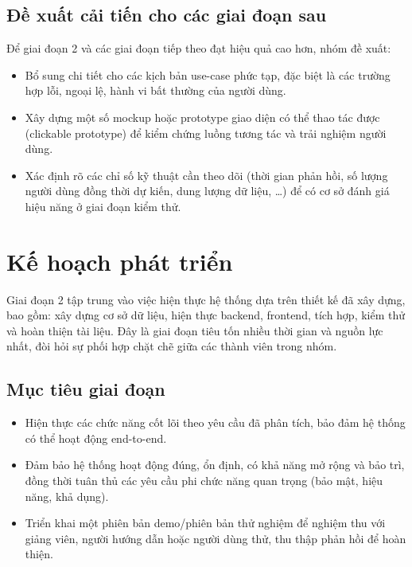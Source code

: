 \subsection{Đề xuất cải tiến cho các giai đoạn sau}

Để giai đoạn 2 và các giai đoạn tiếp theo đạt hiệu quả cao hơn, nhóm đề xuất:

\begin{itemize}
    \item Bổ sung chi tiết cho các kịch bản use-case phức tạp, đặc biệt là các trường hợp lỗi, ngoại lệ, hành vi bất thường của người dùng.
    \item Xây dựng một số mockup hoặc prototype giao diện có thể thao tác được (clickable prototype) để kiểm chứng luồng tương tác và trải nghiệm người dùng.
    \item Xác định rõ các chỉ số kỹ thuật cần theo dõi (thời gian phản hồi, số lượng người dùng đồng thời dự kiến, dung lượng dữ liệu, \ldots) để có cơ sở đánh giá hiệu năng ở giai đoạn kiểm thử.
\end{itemize}

\section{Kế hoạch phát triển}

Giai đoạn 2 tập trung vào việc hiện thực hệ thống dựa trên thiết kế đã xây dựng, bao gồm: xây dựng cơ sở dữ liệu, hiện thực backend, frontend, tích hợp, kiểm thử và hoàn thiện tài liệu. Đây là giai đoạn tiêu tốn nhiều thời gian và nguồn lực nhất, đòi hỏi sự phối hợp chặt chẽ giữa các thành viên trong nhóm.

\subsection{Mục tiêu giai đoạn}

\begin{itemize}
    \item Hiện thực các chức năng cốt lõi theo yêu cầu đã phân tích, bảo đảm hệ thống có thể hoạt động end-to-end.
    \item Đảm bảo hệ thống hoạt động đúng, ổn định, có khả năng mở rộng và bảo trì, đồng thời tuân thủ các yêu cầu phi chức năng quan trọng (bảo mật, hiệu năng, khả dụng).
    \item Triển khai một phiên bản demo/phiên bản thử nghiệm để nghiệm thu với giảng viên, người hướng dẫn hoặc người dùng thử, thu thập phản hồi để hoàn thiện.
\end{itemize}

